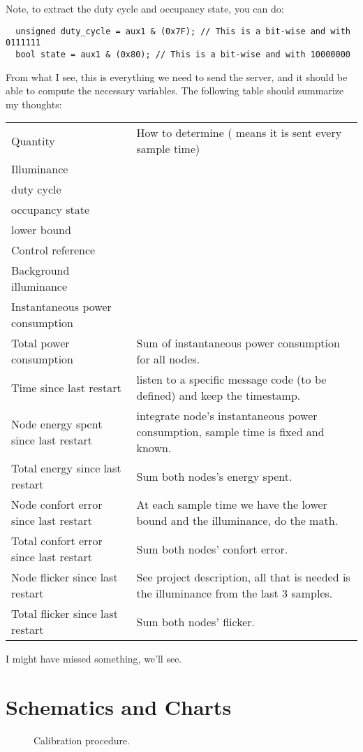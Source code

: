 \documentclass[english,fira]{ist-report}
\begin{document}
Note, to extract the duty cycle and occupancy state, you can do:
\begin{verbatim}
  unsigned duty_cycle = aux1 & (0x7F); // This is a bit-wise and with 0111111
  bool state = aux1 & (0x80); // This is a bit-wise and with 10000000 
\end{verbatim}

From what I see, this is everything we need to send the server, and it should be able to compute the necessary variables. The following table should summarize my thoughts:
\begin{table}[h]
	\centering
	\begin{tabularx}{\linewidth}{l|X}
		Quantity & How to determine (\ccheckmark{} means it is sent every sample time) \\
		Illuminance & \ccheckmark{} \\
		duty cycle  & \ccheckmark{} \\
		occupancy state & \ccheckmark{} \\
		lower bound & \ccheckmark{} \\
		Control reference & \ccheckmark{} \\
		Background illuminance & \ccheckmark{} \\
		Instantaneous power consumption & \ccheckmark{} \\
		Total power consumption & Sum of instantaneous power consumption for all nodes. \\
		Time since last restart & listen to a specific message code (to be defined) and keep the timestamp. \\
		Node energy spent since last restart & integrate node's instantaneous power consumption, sample time is fixed and known. \\
		Total energy since last restart & Sum both nodes's energy spent. \\
		Node confort error since last restart & At each sample time we have the lower bound and the illuminance, do the math. \\
		Total confort error since last restart & Sum both nodes' confort error. \\
		Node flicker since last restart & See project description, all that is needed is the illuminance from the last 3 samples. \\
		Total flicker since last restart & Sum both nodes' flicker.
	\end{tabularx}
\end{table}

I might have missed something, we'll see.

\section{Schematics and Charts}

\begin{figure}[ht]
	\centering
	
	\caption{Calibration procedure.}
	\label{fig:calib}
\end{figure}

\listoftodos
\end{document}
